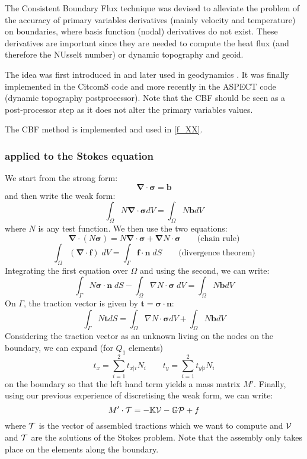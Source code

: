 The Consistent Boundary Flux technique was devised to 
alleviate the problem of the accuracy of primary variables 
derivatives (mainly velocity and temperature) on boundaries, 
where basis function (nodal) derivatives do not exist.
These derivatives are important since they are needed to compute
the heat flux (and therefore the NUsselt number) or 
dynamic topography and geoid. 


The idea was first introduced in \cite{mizu86} and later used 
in geodynamics \cite{zhgh93}. It was finally implemented 
in the CitcomS code \cite{zhmt08} and more recently
in the ASPECT code (dynamic topography postprocessor).
Note that the CBF should be seen as a post-processor step 
as it does not alter the primary variables values.

The CBF method is implemented and used in \ref{f_XX}.

\subsubsection{applied to the Stokes equation}
We start from the strong form:
\[
{\bm \nabla}\cdot{\bm \sigma} = {\bm b}
\]
and then write the weak form:
\[
\int_\Omega N {\bm \nabla}\cdot{\bm \sigma} dV = \int_\Omega N {\bm b} dV
\]
where $N$ is any test function. We then use the two equations:
\[
\bm \nabla \cdot ( N  \bm \sigma ) = N \bm \nabla \cdot \bm \sigma + \bm \nabla N \cdot  \bm \sigma  
\quad\quad \text{(chain rule)}
\]
\[
\int_\Omega (\bm \nabla \cdot \bm f )\; dV = \int_\Gamma \bm f\cdot \bm n \; dS
\quad\quad \text{(divergence theorem)}
\]
Integrating the first equation over $\Omega$ and using the second, we can write:
\[
\int_\Gamma N {\bm \sigma}\cdot {\bm n} \; dS 
-  \int_\Omega {\nabla N} \cdot{\bm \sigma} \; dV 
= \int_\Omega N {\bm b} dV
\]
On $\Gamma$, the traction vector is given by ${\bm t}={\bm \sigma}\cdot {\bm n}$: 
\[
\int_\Gamma N {\bm t} dS =  \int_\Omega {\nabla N} \cdot{\bm \sigma} dV + \int_\Omega N {\bm b} dV
\]
Considering the traction vector as an unknown living on the nodes on the boundary, 
we can expand (for $Q_1$ elements)
\[
t_x = \sum_{i=1}^2 t_{x|i} N_i 
\quad\quad
t_y = \sum_{i=1}^2 t_{y|i} N_i 
\]
on the boundary so that the left hand term yields a mass matrix $M'$.
Finally, using our previous experience of discretising the weak form, we can write:
\[
M' \cdot {\cal T} = -{\mathbb{K}} {\cal V} - {\mathbb{G}} {\cal P} + f
\]
where ${\cal T}$ is the vector of assembled tractions which we want to compute 
and ${\cal V}$ and ${\cal T}$ are the solutions of the Stokes problem. 
Note that the assembly
only takes place on the elements along the boundary.

